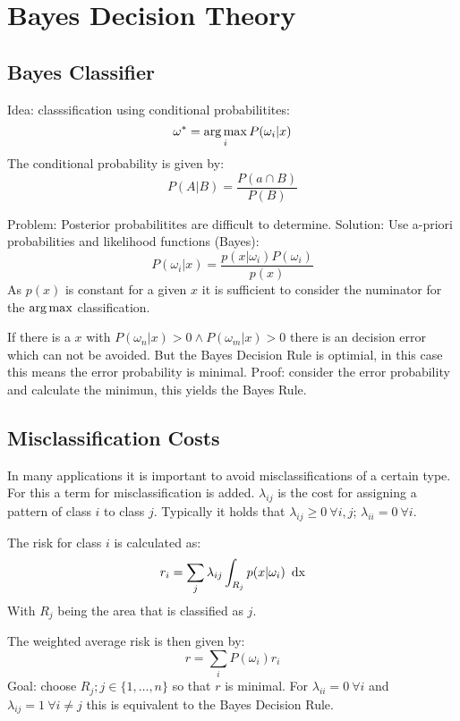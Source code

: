 \chapter{Bayes Decision Theory}
\section{Bayes Classifier}
Idea: classsification using conditional probabilitites:
\begin{equation*}
    \omega^* = \operatorname*{arg\,max}_i P(\omega_i | x)
\end{equation*}
The conditional probability is given by:
\begin{equation*}
    P(A|B) = \frac{P(a \cap B)}{P(B)}
\end{equation*}

Problem: Posterior probabilitites are difficult to determine. Solution: Use a-priori probabilities and likelihood functions (Bayes):
\begin{equation*}
    P(\omega_i | x) = \frac{p(x | \omega_i) P(\omega_i)}{p(x)}
\end{equation*}
As $p(x)$ is constant for a given $x$ it is sufficient to consider the numinator for the $\operatorname*{arg\,max}$ classification. 

If there is a $x$ with $P(\omega_n | x) > 0 \land P(\omega_m | x) > 0$ there is an decision error which can not be avoided. But the Bayes Decision Rule is optimial, in this case this means the error probability is minimal. Proof: consider the error probability and calculate the minimun, this yields the Bayes Rule.

\section{Misclassification Costs}
In many applications it is important to avoid misclassifications of a certain type. 
For this a term for misclassification is added. $\lambda_{ij}$ is the cost for assigning a pattern of class $i$ to class $j$. 
Typically it holds that $\lambda_{ij} \geq 0\ \forall i,j$; $\lambda_{ii} = 0\ \forall i$.

The risk for class $i$ is calculated as:
\begin{equation*}
    r_i = \sum_j \lambda_{ij} \int_{R_j} p(x | \omega_i) \operatorname*{\text{ d}x}
\end{equation*}
With $R_j$ being the area that is classified as $j$.

The weighted average risk is then given by:
\begin{equation*}
    r = \sum_i P(\omega_i) r_i
\end{equation*}
Goal: choose $R_j; j \in \{1, \ldots, n\}$ so that $r$ is minimal. For $\lambda_{ii} = 0\ \forall i$ and $\lambda_{ij} = 1\ \forall i \neq j$ this is equivalent to the Bayes Decision Rule.

